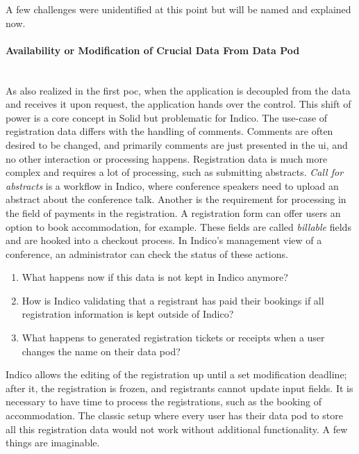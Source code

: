 A few challenges were unidentified at this point but will be named and explained now.
\vspace{0.5cm}
\paragraph{Availability or Modification of Crucial Data From Data Pod}\mbox{}\\

As also realized in the first \gls{poc}, when the application is decoupled from the data and receives it upon request, the application hands over the control. This shift of power is a core concept in Solid but problematic for Indico. The use-case of registration data differs with the handling of comments. Comments are often desired to be changed, and primarily comments are just presented in the \gls{ui}, and no other interaction or processing happens. Registration data is much more complex and requires a lot of processing, such as submitting abstracts. \textit{Call for abstracts} is a workflow in Indico, where conference speakers need to upload an abstract about the conference talk. Another is the requirement for processing in the field of payments in the registration. A registration form can offer users an option to book accommodation, for example. These fields are called \textit{billable} fields and are hooked into a checkout process. In Indico's management view of a conference, an administrator can check the status of these actions.

\begin{enumerate}
    \item What happens now if this data is not kept in Indico anymore?
    \item How is Indico validating that a registrant has paid their bookings if all registration information is kept outside of Indico?
    \item What happens to generated registration tickets or receipts when a user changes the name on their data pod?
\end{enumerate}

Indico allows the editing of the registration up until a set modification deadline; after it, the registration is frozen, and registrants cannot update input fields. It is necessary to have time to process the registrations, such as the booking of accommodation. The classic setup where every user has their data pod to store all this registration data would not work without additional functionality. A few things are imaginable.

